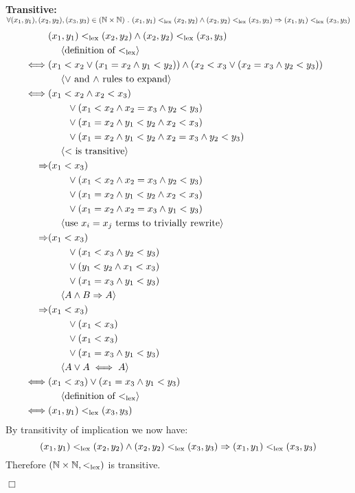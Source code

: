 \documentclass[11pt,fleqn]{article}
\newcommand{\sglsp}{\ }
\newenvironment{proof}{\par\noindent{\bf Proof\sglsp}}{\hfill$\Box$}
\newcommand{\pnote}[1]{{\langle \text{#1} \rangle}}
\begin{document}
\begin{proof}
	\textbf{Transitive:} $\forall (x_1,y_1),(x_2,y_2),(x_3,y_3) \in (\mathbb{N} \times \mathbb{N}) ~.~ (x_1,y_1) <_{\rm lex} (x_2,y_2) \wedge (x_2,y_2) <_{\rm lex} (x_3,y_3) \Rightarrow (x_1,y_1) <_{\rm lex} (x_3,y_3)$\\
	\begin{align*}
		& (x_1,y_1) <_{\rm lex} (x_2,y_2) \wedge (x_2,y_2) <_{\rm lex} (x_3,y_3) & \\
		& ~~~~\pnote{definition of $<_{\rm lex}$} & \\
		\iff & (x_1 < x_2 \vee (x_1 = x_2 \wedge y_1 < y_2)) \wedge (x_2 < x_3 \vee (x_2 = x_3 \wedge y_2 < y_3)) & \\
		& ~~~~\pnote{$\vee$ and $\wedge$ rules to expand}\\
		\iff & (x_1 < x_2 \wedge x_2 < x_3) & \\
		& ~~~~~~\vee (x_1 < x_2 \wedge x_2 = x_3 \wedge y_2 < y_3) & \\
		& ~~~~~~\vee (x_1 = x_2 \wedge y_1 < y_2 \wedge x_2 < x_3) & \\
		& ~~~~~~\vee (x_1 = x_2 \wedge y_1 < y_2 \wedge x_2 = x_3 \wedge y_2 < y_3) & \\
		& ~~~~\pnote{$<$ is transitive} & \\
		\Rightarrow & (x_1 < x_3) & \\
		& ~~~~~~\vee (x_1 < x_2 \wedge x_2 = x_3 \wedge y_2 < y_3) & \\
		& ~~~~~~\vee (x_1 = x_2 \wedge y_1 < y_2 \wedge x_2 < x_3) & \\
		& ~~~~~~\vee (x_1 = x_2 \wedge x_2 = x_3 \wedge y_1 < y_3) & \\
		& ~~~~\pnote{use $x_i = x_j$ terms to trivially rewrite} & \\
		\Rightarrow & (x_1 < x_3) & \\
		& ~~~~~~\vee (x_1 < x_3 \wedge y_2 < y_3) & \\
		& ~~~~~~\vee (y_1 < y_2 \wedge x_1 < x_3) & \\
		& ~~~~~~\vee (x_1 = x_3 \wedge y_1 < y_3) & \\
		& ~~~~\pnote{$A \wedge B \Rightarrow A$} & \\
		\Rightarrow & (x_1 < x_3) & \\
		& ~~~~~~\vee (x_1 < x_3) & \\
		& ~~~~~~\vee (x_1 < x_3) & \\
		& ~~~~~~\vee (x_1 = x_3 \wedge y_1 < y_3) & \\
		& ~~~~\pnote{$A \vee A \iff A$} & \\
		\iff & (x_1 < x_3) \vee (x_1 = x_3 \wedge y_1 < y_3) & \\
		& ~~~~\pnote{definition of $<_{\rm lex}$} & \\
		\iff & (x_1,y_1) <_{\rm lex} (x_3,y_3) & \\
	\end{align*}
	By transitivity of implication we now have:
	\[(x_1,y_1) <_{\rm lex} (x_2,y_2) \wedge (x_2,y_2) <_{\rm lex} (x_3,y_3) \Rightarrow (x_1,y_1) <_{\rm lex} (x_3,y_3)\]
	Therefore $(\mathbb{N} \times \mathbb{N},<_{\rm lex})$ is transitive.
	\medskip


\end{proof}
\end{document}
